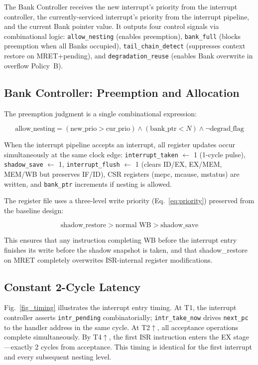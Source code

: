 \documentclass[conference]{IEEEtran}
\begin{document}
The Bank Controller receives the new interrupt's priority from the interrupt controller, the currently-serviced interrupt's priority from the interrupt pipeline, and the current Bank pointer value.
It outputs four control signals via combinational logic: \texttt{allow\_nesting} (enables preemption), \texttt{bank\_full} (blocks preemption when all Banks occupied), \texttt{tail\_chain\_detect} (suppresses context restore on MRET+pending), and \texttt{degradation\_reuse} (enables Bank overwrite in overflow Policy~B).

\subsection{Bank Controller: Preemption and Allocation}

The preemption judgment is a single combinational expression:

\begin{equation}
\text{allow\_nesting} = (\text{new\_prio} > \text{cur\_prio}) \land (\text{bank\_ptr} < N) \land \lnot\text{degrad\_flag}
\label{eq:preempt}
\end{equation}

When the interrupt pipeline accepts an interrupt, all register updates occur simultaneously at the same clock edge: \texttt{interrupt\_taken} $\leftarrow$ 1 (1-cycle pulse), \texttt{shadow\_save} $\leftarrow$ 1, \texttt{interrupt\_flush} $\leftarrow$ 1 (clears ID/EX, EX/MEM, MEM/WB but preserves IF/ID), CSR registers (mepc, mcause, mstatus) are written, and \texttt{bank\_ptr} increments if nesting is allowed.

The register file uses a three-level write priority (Eq.~\ref{eq:priority}) preserved from the baseline design:

\begin{equation}
\text{shadow\_restore} > \text{normal WB} > \text{shadow\_save}
\label{eq:priority}
\end{equation}

This ensures that any instruction completing WB before the interrupt entry finishes its write before the shadow snapshot is taken, and that shadow\_restore on MRET completely overwrites ISR-internal register modifications.

\subsection{Constant 2-Cycle Latency}

Fig.~\ref{fig_timing} illustrates the interrupt entry timing.
At T1, the interrupt controller asserts \texttt{intr\_pending} combinatorially; \texttt{intr\_take\_now} drives \texttt{next\_pc} to the handler address in the same cycle.
At T2$\uparrow$, all acceptance operations complete simultaneously.
By T4$\uparrow$, the first ISR instruction enters the EX stage—exactly 2 cycles from acceptance.
This timing is identical for the first interrupt and every subsequent nesting level.
\end{document}
